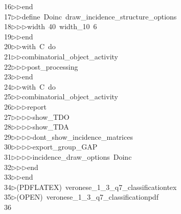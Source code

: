 \begin{tabbing}
16\>$\triangleright$\>$\triangleright$\>end\ \\[0pt]
17\>$\triangleright$\>$\triangleright$\>define\ Doinc\ draw\_incidence\_structure\_options\ \\[0pt]
18\>$\triangleright$\>$\triangleright$\>$\triangleright$\>width\ 40\ width\_10\ 6\ \\[0pt]
19\>$\triangleright$\>$\triangleright$\>end\ \\[0pt]
20\>$\triangleright$\>$\triangleright$\>with\ C\ do\ \\[0pt]
21\>$\triangleright$\>$\triangleright$\>combinatorial\_object\_activity\ \\[0pt]
22\>$\triangleright$\>$\triangleright$\>$\triangleright$\>post\_processing\ \\[0pt]
23\>$\triangleright$\>$\triangleright$\>end\ \\[0pt]
24\>$\triangleright$\>$\triangleright$\>with\ C\ do\ \\[0pt]
25\>$\triangleright$\>$\triangleright$\>combinatorial\_object\_activity\ \\[0pt]
26\>$\triangleright$\>$\triangleright$\>$\triangleright$\>report\ \\[0pt]
27\>$\triangleright$\>$\triangleright$\>$\triangleright$\>$\triangleright$\>show\_TDO\ \\[0pt]
28\>$\triangleright$\>$\triangleright$\>$\triangleright$\>$\triangleright$\>show\_TDA\ \\[0pt]
29\>$\triangleright$\>$\triangleright$\>$\triangleright$\>$\triangleright$\>dont\_show\_incidence\_matrices\ \\[0pt]
30\>$\triangleright$\>$\triangleright$\>$\triangleright$\>$\triangleright$\>export\_group\_GAP\ \\[0pt]
31\>$\triangleright$\>$\triangleright$\>$\triangleright$\>$\triangleright$\>incidence\_draw\_options\ Doinc\ \\[0pt]
32\>$\triangleright$\>$\triangleright$\>$\triangleright$\>end\ \\[0pt]
33\>$\triangleright$\>$\triangleright$\>end\\[0pt]
34\>$\triangleright$\>(PDFLATEX)\ veronese\_1\_3\_q7\_classificationtex\\[0pt]
35\>$\triangleright$\>(OPEN)\ veronese\_1\_3\_q7\_classificationpdf\\[0pt]
36\>\end{tabbing}
